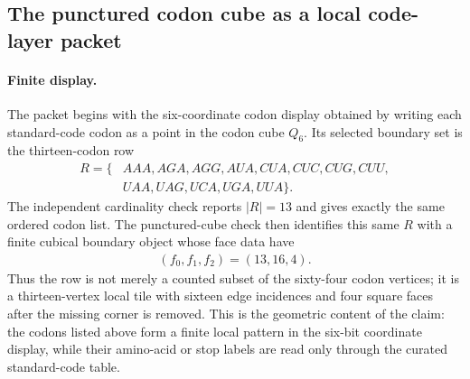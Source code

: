 
\subsection{The punctured codon cube as a local code-layer packet}
\label{sec:bior-punctured-codon-cube}

\paragraph{Finite display.}
The packet begins with the six-coordinate codon display obtained by writing each standard-code codon as a point in the codon cube $Q_6$.  Its selected boundary set is the thirteen-codon row
$$
\begin{aligned}
R=\{&AAA, AGA, AGG, AUA, CUA, CUC, CUG, CUU,\\
&UAA, UAG, UCA, UGA, UUA\}.
\end{aligned}
$$
The independent cardinality check reports $|R|=13$ and gives exactly the same ordered codon list.  The punctured-cube check then identifies this same $R$ with a finite cubical boundary object whose face data have
$$
\begin{aligned}
(f_0,f_1,f_2)=(13,16,4).
\end{aligned}
$$
Thus the row is not merely a counted subset of the sixty-four codon vertices; it is a thirteen-vertex local tile with sixteen edge incidences and four square faces after the missing corner is removed.  This is the geometric content of the claim: the codons listed above form a finite local pattern in the six-bit coordinate display, while their amino-acid or stop labels are read only through the curated standard-code table.

